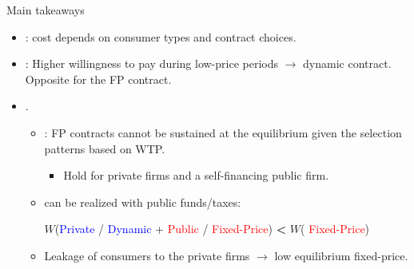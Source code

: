 \documentclass{class}
\begin{document}

\begin{frame}{Main takeaways}


\begin{itemize}

\item {}: cost depends on consumer types and contract choices.


\vfill

\item {}: Higher willingness to pay during low-price periods $\rightarrow$ dynamic contract. Opposite for the FP contract.

\vfill

\item {}.

\vfill

\begin{itemize}
    \item {}: FP contracts cannot be sustained at the equilibrium given the selection patterns based on WTP.
    \begin{itemize}
    \vfill
        \item Hold for private firms and a self-financing public firm.
    \end{itemize}
    \vfill

\item {} can be realized with public funds/taxes: \vfill

    \begin{center}
    $W$(\textcolor{blue}{Private} / \textcolor{blue}{Dynamic} + \textcolor{red}{Public} / \textcolor{red}{Fixed-Price})  { \textbf{  < }} $W$( \textcolor{red}{Fixed-Price})
   \end{center}

\vfill

\item Leakage of consumers to the private firms $\rightarrow$ low equilibrium fixed-price.

    \end{itemize}

\end{itemize}


\end{frame}
\end{document}
